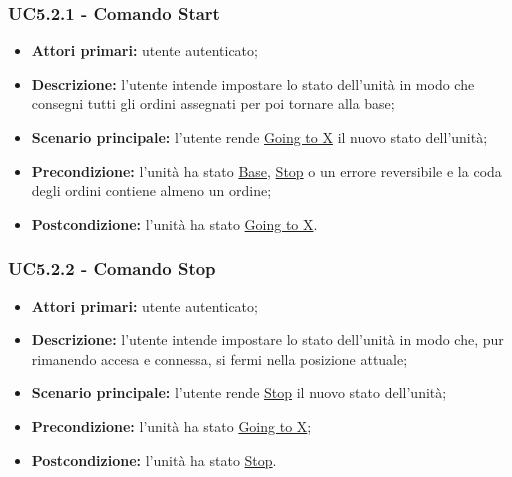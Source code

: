         \subsubsection{UC5.2.1 - Comando Start}
        \begin{itemize}
            \item \textbf{Attori primari:} utente autenticato;
            \item \textbf{Descrizione:} l'utente intende impostare lo stato dell'unità in modo che consegni tutti gli ordini assegnati per poi tornare alla base;
            \item \textbf{Scenario principale:} l'utente rende \underline{Going to X} il nuovo stato dell'unità;
            \item \textbf{Precondizione:} l'unità ha stato \underline{Base}, \underline{Stop} o un errore reversibile e la coda degli ordini contiene almeno un ordine;
            \item \textbf{Postcondizione:} l'unità ha stato \underline{Going to X}.
        \end{itemize}

        \subsubsection{UC5.2.2 - Comando Stop}
        \begin{itemize}
            \item \textbf{Attori primari:} utente autenticato;
            \item \textbf{Descrizione:} l'utente intende impostare lo stato dell'unità in modo che, pur rimanendo accesa e connessa, si fermi nella posizione attuale;
            \item \textbf{Scenario principale:} l'utente rende \underline{Stop} il nuovo stato dell'unità;
            \item \textbf{Precondizione:} l'unità ha stato \underline{Going to X};
            \item \textbf{Postcondizione:} l'unità ha stato \underline{Stop}.
        \end{itemize}

